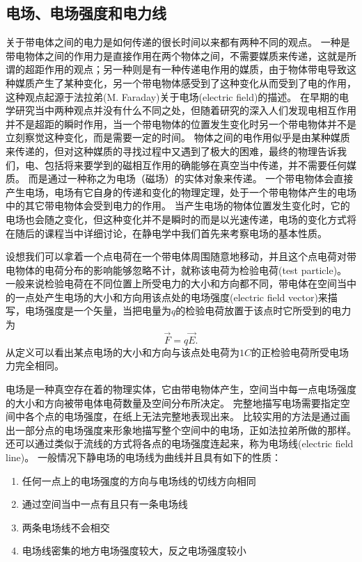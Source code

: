 \subsection{电场、电场强度和电力线}
关于带电体之间的电力是如何传递的很长时间以来都有两种不同的观点。
一种是带电物体之间的作用力是直接作用在两个物体之间，不需要媒质来传递，这就是所谓的超距作用的观点；另一种则是有一种传递电作用的媒质，由于物体带电导致这种媒质产生了某种变化，另一个带电物体感受到了这种变化从而受到了电的作用，这种观点起源于{\heiti 法拉弟}(M. Faraday)关于{\heiti 电场}(electric field)的描述。
在早期的电学研究当中两种观点并没有什么不同之处，但随着研究的深入人们发现电相互作用并不是超距的瞬时作用，当一个带电物体的位置发生变化时另一个带电物体并不是立刻察觉这种变化，而是需要一定的时间。
物体之间的电作用似乎是由某种媒质来传递的，但对这种媒质的寻找过程中又遇到了极大的困难，最终的物理告诉我们，电、包括将来要学到的磁相互作用的确能够在真空当中传递，并不需要任何媒质。
而是通过一种称之为电场（磁场）的实体对象来传递。
一个带电物体会直接产生电场，电场有它自身的传递和变化的物理定理，处于一个带电物体产生的电场中的其它带电物体会受到电力的作用。
当产生电场的物体位置发生变化时，它的电场也会随之变化，但这种变化并不是瞬时的而是以光速传递，电场的变化方式将在随后的课程当中详细讨论，在静电学中我们首先来考察电场的基本性质。

设想我们可以拿着一个点电荷在一个带电体周围随意地移动，并且这个点电荷对带电物体的电荷分布的影响能够忽略不计，就称该电荷为{\heiti 检验电荷}(test particle)。
一般来说检验电荷在不同位置上所受电力的大小和方向都不同，带电体在空间当中的一点处产生电场的大小和方向用该点处的{\heiti 电场强度}(electric field vector)来描写，电场强度是一个矢量，当把电量为$q$的检验电荷放置于该点时它所受到的电力为
\begin{equation}
\vec{F}=q\vec{E}.
\end{equation}
从定义可以看出某点电场的大小和方向与该点处电荷为$1\unit{C}$的正检验电荷所受电场力完全相同。

电场是一种真空存在着的物理实体，它由带电物体产生，空间当中每一点电场强度的大小和方向被带电体电荷数量及空间分布所决定。
完整地描写电场需要指定空间中各个点的电场强度，在纸上无法完整地表现出来。
比较实用的方法是通过画出一部分点的电场强度来形象地描写整个空间中的电场，正如法拉弟所做的那样。
还可以通过类似于流线的方式将各点的电场强度连起来，称为{\heiti 电场线}(electric field line)。
一般情况下静电场的电场线为曲线并且具有如下的性质：
\begin{enumerate}
\item 任何一点上的电场强度的方向与电场线的切线方向相同
\item 通过空间当中一点有且只有一条电场线
\item 两条电场线不会相交
\item 电场线密集的地方电场强度较大，反之电场强度较小
\end{enumerate}


